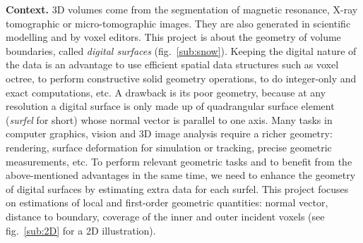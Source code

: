 \noindent\textbf{Context.} 
3D volumes come from the segmentation of magnetic resonance, X-ray tomographic or micro-tomographic images. 
They are also generated in scientific modelling and by voxel editors. 
This project is about the geometry of volume boundaries, called \emph{digital surfaces} (fig.~\ref{sub:snow}). 
Keeping the digital nature of the data is an advantage
to use efficient spatial data structures such as voxel octree, 
to perform constructive solid geometry operations,
to do integer-only and exact computations, etc.
A drawback is its poor geometry, because at any resolution a digital surface is only 
made up of quadrangular surface element (\emph{surfel} for short) 
whose normal vector is parallel to one axis. 
Many tasks in computer graphics, vision and 3D image analysis require a richer geometry: 
rendering, surface deformation for simulation or tracking, precise geometric measurements, etc.
To perform relevant geometric tasks and 
to benefit from the above-mentioned advantages in the same time, 
we need to enhance the geometry of digital surfaces by estimating extra data for each surfel. 
This project focuses on estimations of local and first-order geometric quantities: 
normal vector, distance to boundary, coverage of the inner and outer incident voxels 
(see fig.~\ref{sub:2D} for a 2D illustration).  


